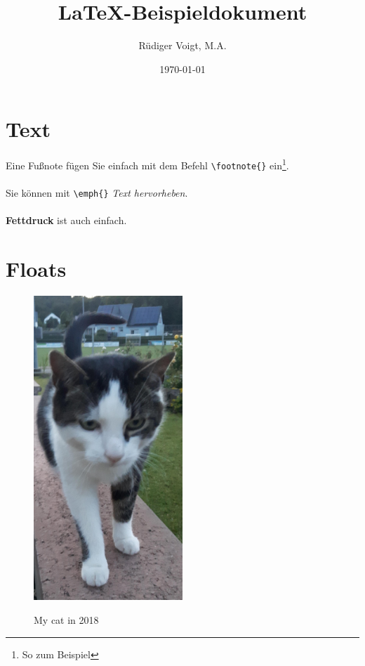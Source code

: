 \documentclass{article}
\title{\LaTeX-Beispieldokument}
\author{\foreignlanguage{ngerman}{Rüdiger Voigt, M.A.}}
\date{\today}
\begin{document}
\maketitle

\begin{abstract}
\blindtext
\end{abstract}

\tableofcontents

\listoffigures

\newpage





\section{Text}

Eine Fußnote fügen Sie einfach mit dem Befehl \verb|\footnote{}| ein\footnote{So zum Beispiel}.\\
\\
Sie können mit \verb|\emph{}| \emph{Text hervorheben}.\\
\\
\textbf{Fettdruck} ist auch einfach.


\section{Floats}

\begin{figure}[htbp]
\centering
\includegraphics[width=0.5\textwidth]{img/2019-Dala-Mauer}
\label{img:cat}
\caption[Katze]{My cat in 2018}
\end{figure}
\end{document}
